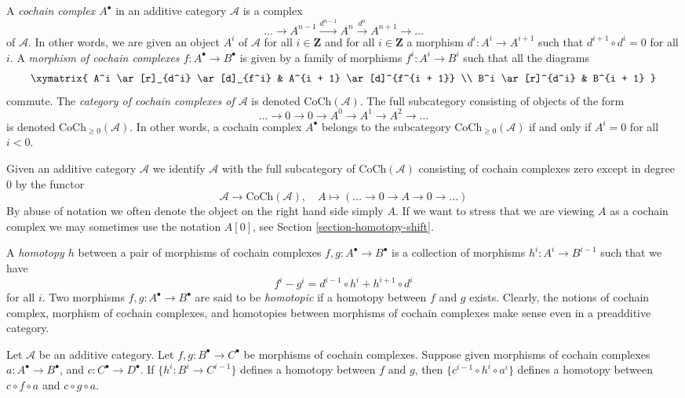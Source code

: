 \noindent
A {\it cochain complex $A^\bullet$} in an additive category $\mathcal{A}$
is a complex
$$
\ldots \to
A^{n - 1} \xrightarrow{d^{n - 1}}
A^n \xrightarrow{d^n}
A^{n + 1} \to
\ldots
$$
of $\mathcal{A}$. In other words, we are given an object $A^i$ of
$\mathcal{A}$ for all $i \in \mathbf{Z}$ and for
all $i \in \mathbf{Z}$ a morphism $d^i : A^i \to A^{i + 1}$ such that
$d^{i + 1} \circ d^i = 0$ for all $i$. A {\it morphism of cochain
complexes $f : A^\bullet \to B^\bullet$} is given by a
family of morphisms $f^i : A^i \to B^i$ such that all
the diagrams
$$
\xymatrix{
A^i \ar[r]_{d^i} \ar[d]_{f^i} & A^{i + 1} \ar[d]^{f^{i + 1}} \\
B^i \ar[r]^{d^i} & B^{i + 1}
}
$$
commute. The {\it category of cochain complexes of $\mathcal{A}$}
is denoted $\text{CoCh}(\mathcal{A})$. The full subcategory consisting
of objects of the form
$$
\ldots \to 0 \to 0 \to A^0 \to A^1 \to A^2 \to \ldots
$$
is denoted $\text{CoCh}_{\geq 0}(\mathcal{A})$.
In other words, a cochain complex $A^\bullet$ belongs to the subcategory
$\text{CoCh}_{\geq 0}(\mathcal{A})$ if and only if
$A^i = 0$ for all $i < 0$.

\medskip\noindent
Given an additive category $\mathcal{A}$ we identify $\mathcal{A}$
with the full subcategory of $\text{CoCh}(\mathcal{A})$ consisting
of cochain complexes zero except in degree $0$ by the functor
$$
\mathcal{A} \longrightarrow \text{CoCh}(\mathcal{A}),\quad
A \longmapsto (\ldots \to 0 \to A \to 0 \to \ldots)
$$
By abuse of notation we often denote the object on the right hand side
simply $A$. If we want to stress that we are viewing $A$ as a cochain
complex we may sometimes use the notation $A[0]$, see
Section \ref{section-homotopy-shift}.

\medskip\noindent
A {\it homotopy $h$} between a pair of morphisms
of cochain complexes $f, g : A^\bullet \to B^\bullet$
is a collection of morphisms $h^i : A^i \to B^{i - 1}$
such that we have
$$
f^i - g^i = d^{i - 1} \circ h^i + h^{i + 1} \circ d^i
$$
for all $i$.
Two morphisms $f, g : A^\bullet \to B^\bullet$ are
said to be {\it homotopic} if a homotopy between $f$
and $g$ exists.
Clearly, the notions of cochain complex, morphism of
cochain complexes, and homotopies between morphisms of cochain complexes
make sense even in a preadditive category.

\begin{lemma}
\label{lemma-compose-homotopy-cochain}
Let $\mathcal{A}$ be an additive category.
Let $f, g : B^\bullet \to C^\bullet$ be morphisms
of cochain complexes. Suppose given morphisms of cochain
complexes $a : A^\bullet \to B^\bullet$, and
$c : C^\bullet \to D^\bullet$.
If $\{h^i : B^i \to C^{i - 1}\}$ defines a homotopy
between $f$ and $g$, then $\{c^{i - 1} \circ h^i \circ a^i\}$
defines a homotopy between $c \circ f \circ a$ and
$c \circ g \circ a$.
\end{lemma}

